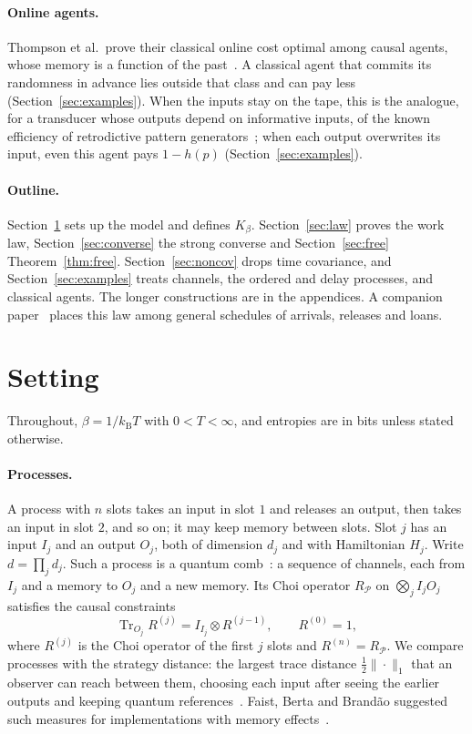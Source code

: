 \documentclass[11pt]{article}
\theoremstyle{definition}
\theoremstyle{remark}
\newcommand{\Tr}{\operatorname{Tr}}
\newcommand{\kB}{k_{\mathrm B}}
\newcommand{\Kb}{K_\beta}
\newcommand{\Pp}{\mathcal P}
\begin{document}
\paragraph{Online agents.} Thompson et al.\ prove their classical online cost optimal among causal agents, whose memory is a function of the past~\cite{Thompson25}. A classical agent that commits its randomness in advance lies outside that class and can pay less (Section~\ref{sec:examples}). When the inputs stay on the tape, this is the analogue, for a transducer whose outputs depend on informative inputs, of the known efficiency of retrodictive pattern generators~\cite{BMRC17,BMC18,LoomisCrutchfield20}; when each output overwrites its input, even this agent pays $1-h(p)$ (Section~\ref{sec:examples}).

\paragraph{Outline.} Section~\ref{sec:setting} sets up the model and defines $\Kb$. Section~\ref{sec:law} proves the work law, Section~\ref{sec:converse} the strong converse and Section~\ref{sec:free} Theorem~\ref{thm:free}. Section~\ref{sec:noncov} drops time covariance, and Section~\ref{sec:examples} treats channels, the ordered and delay processes, and classical agents. The longer constructions are in the appendices. A companion paper~\cite{TimeOrder} places this law among general schedules of arrivals, releases and loans.

\section{Setting}\label{sec:setting}

Throughout, $\beta=1/\kB T$ with $0<T<\infty$, and entropies are in bits unless stated otherwise.

\paragraph{Processes.} A process with $n$ slots takes an input in slot $1$ and releases an output, then takes an input in slot $2$, and so on; it may keep memory between slots. Slot $j$ has an input $I_j$ and an output $O_j$, both of dimension $d_j$ and with Hamiltonian $H_j$. Write $d=\prod_jd_j$. Such a process is a quantum comb~\cite{Chiribella08,CDP09,GutoskiWatrous07}: a sequence of channels, each from $I_j$ and a memory to $O_j$ and a new memory. Its Choi operator $R_\Pp$ on $\bigotimes_jI_jO_j$ satisfies the causal constraints
\begin{equation}\label{eq:causal}
\Tr_{O_j}R^{(j)}=I_{I_j}\otimes R^{(j-1)},\qquad R^{(0)}=1,
\end{equation}
where $R^{(j)}$ is the Choi operator of the first $j$ slots and $R^{(n)}=R_\Pp$. We compare processes with the strategy distance: the largest trace distance $\frac12\|\cdot\|_1$ that an observer can reach between them, choosing each input after seeing the earlier outputs and keeping quantum references~\cite{Chiribella08,GutoskiWatrous07}. Faist, Berta and Brand\~ao suggested such measures for implementations with memory effects~\cite{FBB19}.
\end{document}
